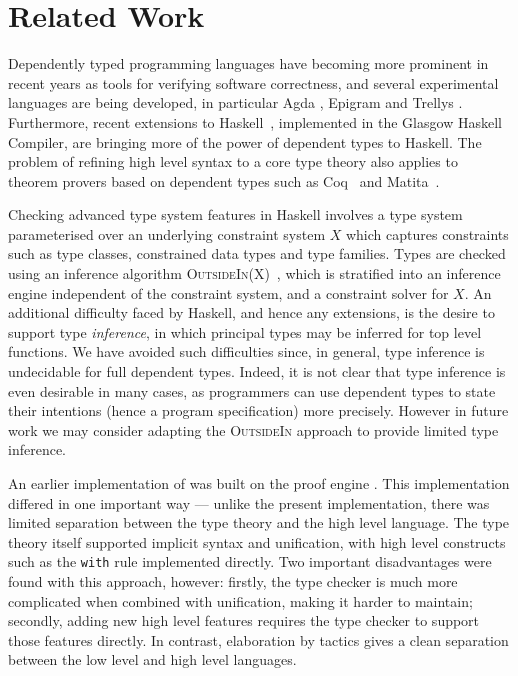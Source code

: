 \section{Related Work}

\label{sect:related}

Dependently typed programming languages have becoming more prominent in recent
years as tools for verifying software correctness, and several experimental
languages are being developed, in particular Agda \cite{norell2007thesis},
Epigram \cite{McBride2004a,Levitation2010} and Trellys \cite{Kimmell2012}.
Furthermore, recent extensions to Haskell~\cite{Haskell98}, implemented in the
Glasgow Haskell Compiler, are bringing more of the power of dependent types to
Haskell. The problem of refining high level syntax to a core type theory also
applies to theorem provers based on dependent types such as
Coq~\cite{Bertot2004} and Matita~\cite{Asperti2011}.

Checking advanced type system features in Haskell involves a type system
parameterised over an underlying constraint system $X$ which captures
constraints such as type classes, constrained data types and type families.
Types are checked using an inference algorithm
\textsc{OutsideIn(X)}~\cite{Vytiniotis2011}, which is stratified into an
inference engine independent of the constraint
system, and a constraint solver for $X$. An additional difficulty faced by
Haskell, and hence any extensions, is the desire to support type \emph{inference}, in
which principal types may be inferred for top level functions. We have avoided
such difficulties since, in general, type
inference is undecidable for full dependent types. Indeed, it is not clear
that type inference is even desirable in many cases, as programmers
can use dependent types to state their intentions (hence a program
specification) more precisely. However in future work we
may consider adapting the \textsc{OutsideIn} approach to provide limited type
inference.

An earlier implementation of \Idris{} was built on the \Ivor{} proof engine
\cite{Brady2006b}. This implementation differed in one important way --- unlike
the present implementation, there was limited separation between the type
theory and the high level language. The type theory itself supported implicit
syntax and unification, with high level constructs such as the \texttt{with}
rule implemented directly. Two important disadvantages were found with this
approach, however: firstly, the type checker is much more complicated when
combined with unification, making it harder to maintain; secondly, adding new
high level features requires the type checker to support those features
directly. In contrast, elaboration by tactics gives a clean separation between
the low level and high level languages.

